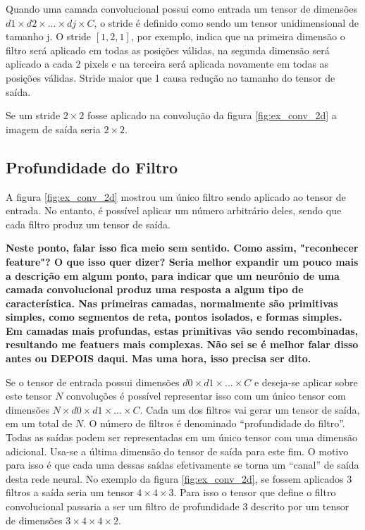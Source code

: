 Quando uma camada convolucional possui como entrada um tensor de dimensões
$d1\times d2 \times ... \times dj \times C$, o stride é definido como sendo
um tensor unidimensional de tamanho j.
O stride $[1,2,1]$, por exemplo, indica que na primeira dimensão o
filtro será aplicado em todas as posições válidas, na segunda dimensão será
aplicado a cada 2 pixels e na terceira será aplicada novamente em todas as
posições válidas. Stride maior que 1 causa redução no tamanho do tensor de
saída.

Se um stride $2 \times 2$ fosse aplicado na convolução da figura
\ref{fig:ex_conv_2d} a imagem de saída seria $2 \times 2$.

\subsection{Profundidade do Filtro}
A figura \ref{fig:ex_conv_2d} mostrou um único filtro sendo aplicado ao
tensor de entrada. No
entanto, é possível aplicar um número arbitrário deles, sendo que cada filtro
produz um tensor de saída.

\textbf{Neste ponto, falar isso fica meio sem sentido. Como assim, "reconhecer
feature"? O que isso quer dizer? Seria melhor expandir um pouco mais a
descrição em algum ponto, para indicar que um neurônio de uma camada
convolucional produz uma resposta a algum tipo de característica. Nas primeiras
camadas, normalmente são primitivas simples, como segmentos de reta, pontos
isolados, e formas simples. Em camadas mais profundas, estas primitivas vão
sendo recombinadas, resultando me featuers mais complexas. Não sei se é melhor
falar disso antes ou DEPOIS daqui. Mas uma hora, isso precisa ser dito.}

Se o tensor de entrada possui dimensões $d0 \times d1 \times ... \times C$
e deseja-se aplicar sobre este
tensor $N$ convoluções é possível representar isso com um único tensor
com dimensões
$N \times d0 \times d1 \times ... \times C$. Cada um dos filtros vai gerar
um tensor de saída, em um total de $N$. O
número de filtros é denominado “profundidade do filtro”. Todas as saídas podem
ser representadas em um único tensor com uma dimensão adicional. Usa-se a última
dimensão do tensor de saída para este fim. O motivo para isso é que cada uma
dessas saídas efetivamente se torna um “canal” de saída desta rede neural. No
exemplo da figura \ref{fig:ex_conv_2d}, se fossem aplicados 3 filtros a saída
seria um tensor $4 \times 4 \times 3$. Para isso o tensor que define o filtro
convolucional passaria a ser um
filtro de profundidade 3 descrito por um tensor de dimensões
$3 \times 4 \times 4 \times 2$.

